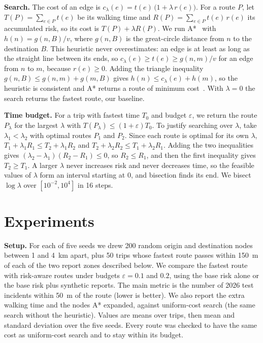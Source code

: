 \documentclass{article}
\begin{document}
\textbf{Search.} The cost of an edge is $c_\lambda(e) = t(e)\,\big(1+\lambda\, r(e)\big)$. For a
route $P$, let $T(P)=\sum_{e\in P} t(e)$ be its walking time and $R(P)=\sum_{e\in P} t(e)\,r(e)$
its accumulated risk, so its cost is $T(P)+\lambda R(P)$. We run A*~\cite{hart1968formal} with
$h(n)=g(n,B)/v$, where $g(n,B)$ is the great-circle distance from $n$ to the destination $B$. This
heuristic never overestimates: an edge is at least as long as the straight line between its ends,
so $c_\lambda(e) \ge t(e) \ge g(n,m)/v$ for an edge from $n$ to $m$, because $r(e)\ge 0$. Adding
the triangle inequality $g(n,B) \le g(n,m)+g(m,B)$ gives $h(n) \le c_\lambda(e) + h(m)$, so the
heuristic is consistent and A* returns a route of minimum cost~\cite{russell2021}. With
$\lambda=0$ the search returns the fastest route, our baseline.

\textbf{Time budget.} For a trip with fastest time $T_0$ and budget $\varepsilon$, we return the
route $P_\lambda$ for the largest $\lambda$ with $T(P_\lambda)\le(1+\varepsilon)T_0$. To justify
searching over $\lambda$, take $\lambda_1<\lambda_2$ with optimal routes $P_1$ and $P_2$. Since
each route is optimal for its own $\lambda$,
$T_1+\lambda_1 R_1 \le T_2+\lambda_1 R_2$ and $T_2+\lambda_2 R_2 \le T_1+\lambda_2 R_1$. Adding
the two inequalities gives $(\lambda_2-\lambda_1)(R_2-R_1)\le 0$, so $R_2\le R_1$, and then the
first inequality gives $T_2 \ge T_1$. A larger $\lambda$ never increases risk and never decreases
time, so the feasible values of $\lambda$ form an interval starting at 0, and bisection finds its
end. We bisect $\log\lambda$ over $[10^{-2},10^{4}]$ in 16 steps.

\section{Experiments}
\label{sec:experiments}

\textbf{Setup.} For each of five seeds we drew 200 random origin and destination nodes between 1
and 4~km apart, plus 50 trips whose fastest route passes within 150~m of each of the two report
zones described below. We compare the fastest route with risk-aware routes under budgets
$\varepsilon=0.1$ and $0.2$, using the base risk alone or the base risk plus synthetic reports.
The main metric is the number of 2026 test incidents within 50~m of the route (lower is better).
We also report the extra walking time and the nodes A* expanded, against uniform-cost search
(the same search without the heuristic). Values are means over trips, then mean and standard
deviation over the five seeds. Every route was checked to have the same cost as uniform-cost
search and to stay within its budget.
\end{document}
